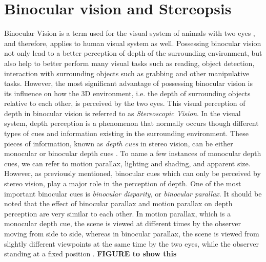 \chapter{Binocular vision and Stereopsis}
\label{chap:BinocularVision}

Binocular Vision is a term used for the visual system of animals with two eyes \cite{how95}, and therefore, applies to human visual system as well. 
Possessing binocular vision not only lead to a better perception of depth
of the surrounding environment, but also help to better perform many visual tasks such as reading, object detection, interaction with surrounding objects such as grabbing and other manipulative 
tasks. However, the most significant advantage of possessing binocular vision is its influence on how the 3D environment, i.e. the depth of surrounding objects relative to each other, 
is perceived by the two eyes. This visual perception of depth in binocular vision is referred to as {\it Stereoscopic Vision}.
In the visual system, depth perception is a phenomenon that normally occurs though different types of cues and information existing in the surrounding environment. 
These pieces of information, known as {\it depth cues} in stereo vision, can be either monocular or binocular depth cues \cite{how95}.
To name a few instances of monocular depth cues, we can refer to motion parallax, lighting and shading, and apparent size. 
However, as previously mentioned, binocular cues which can only be perceived
by stereo vision, play a major role in the perception of depth. One of the most important binocular cues is {\it binocular disparity}, or {\it binocular parallax}. 
It should be noted that the effect of binocular parallax and motion parallax on depth perception are very similar to each other. 
In motion parallax, which is a monocular depth cue, the scene is viewed at different times by the observer moving from side to side, 
whereas in binocular parallax, the scene is viewed from slightly different viewpoints at
the same time by the two eyes, while the observer standing at a fixed position \cite{how95}. \textbf{FIGURE to show this}

